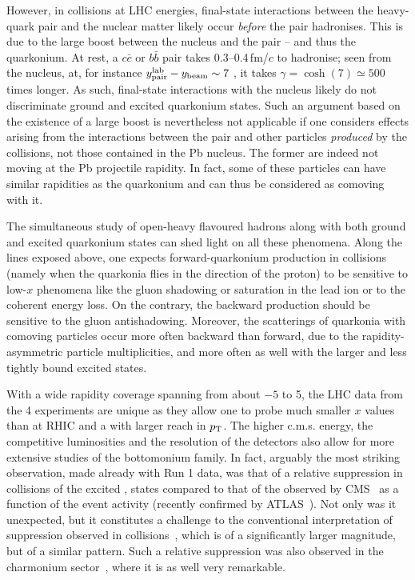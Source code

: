 \documentclass[../report.tex]{subfiles}
\begin{document}
However, in \pPb collisions at LHC energies, final-state interactions between the heavy-quark pair and the nuclear matter likely occur {\it before} the pair hadronises. This is due to the large boost between the nucleus and the pair -- and thus the quarkonium. At rest, a $c \bar c$ or $b\bar b$ pair takes 0.3--0.4\,fm/$c$ to hadronise; seen from the nucleus, at, for instance $y^{\rm lab}_{\rm pair}-y_{\rm beam} \sim 7$ , it takes $\gamma=\cosh(7) \simeq 500$ times longer. As such, final-state interactions with the nucleus likely do not discriminate ground and excited quarkonium states. Such an argument based on the existence of a large boost is nevertheless not applicable if one considers effects arising from the interactions between the pair and other particles {\it produced} by the \pPb collisions, not those contained in the Pb nucleus. The former are indeed not moving at the Pb projectile rapidity. In fact, some of these particles can have similar rapidities as the quarkonium and can thus be considered as comoving with it.
 
The simultaneous study of open-heavy flavoured hadrons along with both ground and excited quarkonium states can shed light on all these phenomena. Along the lines exposed above, one expects forward-quarkonium production in \pPb collisions (namely when the quarkonia flies in the direction of the proton) to be sensitive to low-$x$ phenomena like the gluon shadowing or saturation in the lead ion or to the coherent energy loss. On the contrary, the backward production should be sensitive to the gluon antishadowing. Moreover, the scatterings of quarkonia with comoving particles occur more often backward than forward, due to the rapidity-asymmetric particle multiplicities, and more often as well with the larger and less tightly bound excited states. 
   
With a wide rapidity coverage spanning from about $-5$ to 5, the LHC data from the 4 experiments are unique as they allow one to probe much smaller $x$ values than at RHIC and a with larger reach in $p\sb{\scriptstyle\mathrm{T}}$. The higher c.m.s. energy, the competitive luminosities and the resolution of the detectors also allow for more extensive studies of the bottomonium family. In fact, arguably the most striking observation, made already with Run 1 data, was that of a relative suppression in \pPb collisions of the excited , states compared to that of the  observed by CMS~\cite{Chatrchyan:2013nza} as a function of the event activity (recently confirmed by ATLAS~\cite{Aaboud:2017cif}). Not only was it unexpected, but it constitutes a challenge to the conventional interpretation of suppression observed in \PbPb collisions~\cite{Chatrchyan:2012lxa,Sirunyan:2017lzi,Sirunyan:2018nsz}, which is of a significantly larger magnitude, but of a similar pattern. Such a relative suppression was also observed in the charmonium sector~\cite{Abelev:2014zpa}, where it is as well very remarkable.
\end{document}
